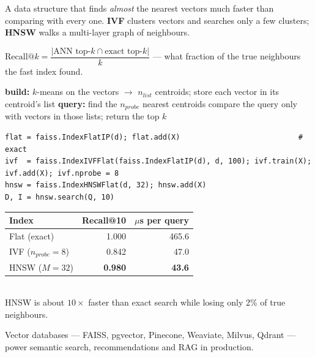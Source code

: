 \documentclass[11pt,a4paper]{article}
\begin{document}
\begin{bdef}
A data structure that finds \emph{almost} the nearest vectors much faster than comparing with every one. \textbf{IVF} clusters vectors and searches only a few clusters; \textbf{HNSW} walks a multi-layer graph of neighbours.
\end{bdef}
\begin{bmath}
$\text{Recall@}k=\dfrac{|\text{ANN top-}k\cap\text{exact top-}k|}{k}$ --- what fraction of the true neighbours the fast index found.
\end{bmath}
\begin{balgo}
\begin{algorithmic}[1]
\State \textbf{build:} $k$-means on the vectors $\rightarrow$ $n_{list}$ centroids; store each vector in its centroid's list
\State \textbf{query:} find the $n_{probe}$ nearest centroids
\State compare the query only with vectors in those lists; return the top $k$
\end{algorithmic}
\end{balgo}
\begin{bcode}
\begin{lstlisting}
flat = faiss.IndexFlatIP(d); flat.add(X)                           # exact
ivf  = faiss.IndexIVFFlat(faiss.IndexFlatIP(d), d, 100); ivf.train(X); ivf.add(X); ivf.nprobe = 8
hnsw = faiss.IndexHNSWFlat(d, 32); hnsw.add(X)
D, I = hnsw.search(Q, 10)
\end{lstlisting}
\end{bcode}
\begin{bres}
\begin{tabular}{lrr}
\toprule
Index & Recall@10 & $\mu$s per query\\
\midrule
Flat (exact) & 1.000 & 465.6\\
IVF ($n_{probe}=8$) & 0.842 & 47.0\\
HNSW ($M=32$) & \textbf{0.980} & \textbf{43.6}\\
\bottomrule
\end{tabular}\\[3pt]
HNSW is about $10\times$ faster than exact search while losing only 2\% of true neighbours.
\end{bres}
\begin{bapp}
Vector databases --- FAISS, pgvector, Pinecone, Weaviate, Milvus, Qdrant --- power semantic search, recommendations and RAG in production.
\end{bapp}
\end{document}
